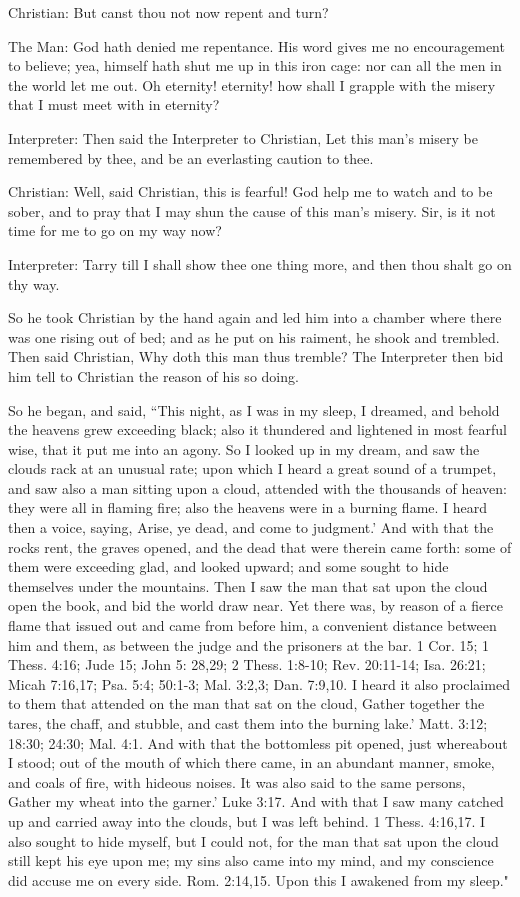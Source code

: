 Christian: But canst thou not now repent and turn?

The Man: God hath denied me repentance. His word gives me no encouragement to believe; yea, himself hath shut me up in this iron cage: nor can all the men in the world let me out. Oh eternity! eternity! how shall I grapple with the misery that I must meet with in eternity?

Interpreter: Then said the Interpreter to Christian, Let this man's misery be remembered by thee, and be an everlasting caution to thee.

Christian: Well, said Christian, this is fearful! God help me to watch and to be sober, and to pray that I may shun the cause of this man's misery. Sir, is it not time for me to go on my way now?

Interpreter: Tarry till I shall show thee one thing more, and then thou shalt go on thy way.

So he took Christian by the hand again and led him into a chamber where there was one rising out of bed; and as he put on his raiment, he shook and trembled. Then said Christian, Why doth this man thus tremble? The Interpreter then bid him tell to Christian the reason of his so doing.

So he began, and said, ``This night, as I was in my sleep, I dreamed, and behold the heavens grew exceeding black; also it thundered and lightened in most fearful wise, that it put me into an agony. So I looked up in my dream, and saw the clouds rack at an unusual rate; upon which I heard a great sound of a trumpet, and saw also a man sitting upon a cloud, attended with the thousands of heaven: they were all in flaming fire; also the heavens were in a burning flame. I heard then a voice, saying, Arise, ye dead, and come to judgment.' And with that the rocks rent, the graves opened, and the dead that were therein came forth: some of them were exceeding glad, and looked upward; and some sought to hide themselves under the mountains. Then I saw the man that sat upon the cloud open the book, and bid the world draw near. Yet there was, by reason of a fierce flame that issued out and came from before him, a convenient distance between him and them, as between the judge and the prisoners at the bar. 1 Cor. 15; 1 Thess. 4:16; Jude 15; John 5: 28,29; 2 Thess. 1:8-10; Rev. 20:11-14; Isa. 26:21; Micah 7:16,17; Psa. 5:4; 50:1-3; Mal. 3:2,3; Dan. 7:9,10. I heard it also proclaimed to them that attended on the man that sat on the cloud, Gather together the tares, the chaff, and stubble, and cast them into the burning lake.' Matt. 3:12; 18:30; 24:30; Mal. 4:1. And with that the bottomless pit opened, just whereabout I stood; out of the mouth of which there came, in an abundant manner, smoke, and coals of fire, with hideous noises. It was also said to the same persons, Gather my wheat into the garner.' Luke 3:17. And with that I saw many catched up and carried away into the clouds, but I was left behind. 1 Thess. 4:16,17. I also sought to hide myself, but I could not, for the man that sat upon the cloud still kept his eye upon me; my sins also came into my mind, and my conscience did accuse me on every side. Rom. 2:14,15. Upon this I awakened from my sleep."

